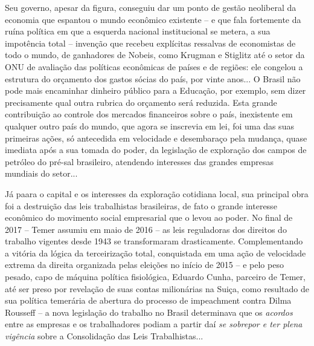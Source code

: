 Seu governo, apesar da figura, conseguiu dar um ponto de gestão
neoliberal da economia que espantou o mundo econômico existente -- e que
fala fortemente da ruína política em que a esquerda nacional
institucional se metera, a sua impotência total -- invenção que recebeu
explícitas ressalvas de economistas de todo o mundo, de ganhadores de
Nobeis, como Krugman e Stiglitz até o setor da ONU de avaliação das
políticas econômicas de países e de regiões: ele congelou a estrutura do
orçamento dos gastos sócias do país, por vinte anos... O Brasil não pode
mais encaminhar dinheiro público para a Educação, por exemplo, sem dizer
precisamente qual outra rubrica do orçamento será reduzida. Esta grande
contribuição ao controle dos mercados financeiros sobre o país,
inexistente em qualquer outro país do mundo, que agora se inscrevia em
lei, foi uma das suas primeiras ações, só antecedida em velocidade e
desembaraço pela mudança, quase imediata após a sua tomada do poder, da
legislação de exploração dos campos de petróleo do pré-sal brasileiro,
atendendo interesses das grandes empresas mundiais do setor...

Já paara o capital e os interesses da exploração cotidiana local, sua
principal obra foi a destruição das leis trabalhistas brasileiras, de
fato o grande interesse econômico do movimento social empresarial que o
levou ao poder. No final de 2017 -- Temer assumiu em maio de 2016 -- as
leis reguladoras dos direitos do trabalho vigentes desde 1943 se
transformaram drasticamente. Complementando a vitória da lógica da
terceirização total, conquistada em uma ação de velocidade extrema da
direita organizada pelas eleições no início de 2015 -- e pelo peso
pesado, capo de máquina política fisiológica, Eduardo Cunha, parceiro de
Temer, até ser preso por revelação de suas contas milionárias na Suiça,
como resultado de sua política temerária de abertura do processo de
impeachment contra Dilma Rousseff -- a nova legislação do trabalho no
Brasil determinava que os \emph{acordos} entre as empresas e os
trabalhadores podiam a partir daí \emph{se sobrepor e ter plena
vigência} sobre a Consolidação das Leis Trabalhistas...

